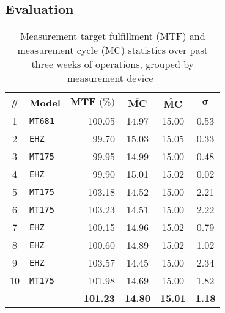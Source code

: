 \begin{appendices}
\FloatBarrier


\chapter{Evaluation}
\label{app:conclusion}

\begin{table}[hbt]
	\centering
  	\begin{tabularx}{\textwidth}{|c|X|r|c|c|c|}
		\hline
		\textbf{\#} & \textbf{Model} & $\textbf{MTF~(\%)}$ & ${\overline{\textbf{MC}}}$ & $\widetilde{\textbf{MC}}$ & $\boldsymbol{\sigma}$ \\
	    	\hline
	    1 	& \texttt{MT681} 	& 100.05 	& 14.97 & 15.00 & 0.53 \\ %
	    	\hline
	    	2 	& \texttt{EHZ}		& 99.70	 	& 15.03 & 15.05 & 0.33 \\ %
	    	\hline
	    	3 	& \texttt{MT175}	& 99.95 	& 14.99 & 15.00 & 0.48 \\ %
	    \hline
	    	4 	& \texttt{EHZ}		& 99.90 	& 15.01 & 15.02 & 0.02 \\ %
	    	\hline
	    5 	& \texttt{MT175}	& 103.18 	& 14.52 & 15.00 & 2.21 \\ %
	    	6 	& \texttt{MT175}	& 103.23 	& 14.51 & 15.00 & 2.22 \\ %
	    	\hline
	    7 	& \texttt{EHZ}		& 100.15 	& 14.96 & 15.02 & 0.79 \\ %
	    \hline
	    	8 	& \texttt{EHZ}		& 100.60 	& 14.89 & 15.02 & 1.02 \\ %
	    	\hline
	    9 	& \texttt{EHZ} 		& 103.57 	& 14.45 & 15.00 & 2.34 \\ %
	    	10 	& \texttt{MT175}	& 101.98 	& 14.69 & 15.00 & 1.82 \\ %
	    	\hline
	    	\hline
	    	& & \textbf{101.23} & \textbf{14.80} & \textbf{15.01} & \textbf{1.18}  \\
	    	\hline
	\end{tabularx}
  	\caption[Measurement statistics, grouped by measurement device]{Measurement target fulfillment ($\text{MTF}$) and measurement cycle ($\text{MC}$) statistics over past three weeks of operations, grouped by measurement device~\footnotemark}
  	\label{tab:measurement-cycle-statistics}
\end{table}


\end{appendices}
